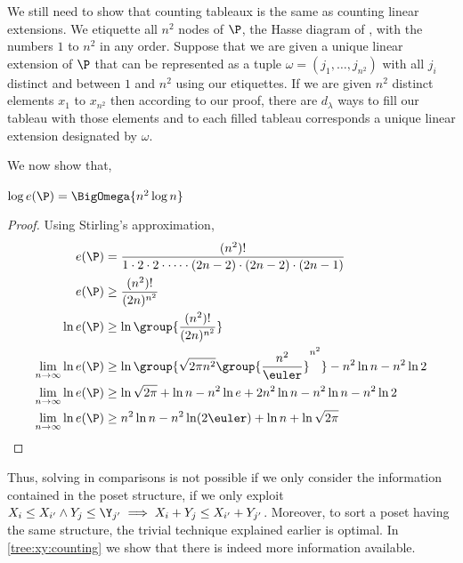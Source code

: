 We still need to show that counting tableaux is the same as counting linear
extensions. We etiquette all \( n^2 \) nodes of \(\P\), the Hasse diagram of
\XY, with the numbers \(1\) to \( n^2 \) in any order. Suppose that we are
given a unique linear extension of \(\P\) that can be represented as a tuple
\( \omega = ( j_1 , \ldots , j_{n^2}) \)
with all \( j_i \) distinct and between \(1\) and \( n^2 \) using our
etiquettes. If we are given \( n^2 \) distinct elements \( x_1 \) to
\( x_{n^2} \) then according to our proof, there are \( d_{\lambda} \) ways to
fill our tableau with those elements and to each filled tableau corresponds a
unique linear extension designated by \(\omega\).


We now show that,

\begin{theorem}
\( \log e(\P) = \BigOmega{n^2 \log n} \)
\end{theorem}

\begin{proof}
Using Stirling's approximation,
\begin{align}
e(\P) &= \frac{(n^2)!}{1 \cdot 2 \cdot 2 \cdot \cdots \cdot (2n-2) \cdot (2n-2) \cdot (2n-1)}\\
e(\P) &\ge \frac{(n^2)!}{(2n)^{n^2}}\\
\ln e(\P) &\ge \ln \group{\frac{(n^2)!}{(2n)^{n^2}}}\\
\lim_{n \to \infty} \ln e(\P) &\ge \ln{\group{\sqrt{2 \pi n^2}
\group{\frac{n^2}{\euler}}^{n^2}}}  - n^2 \ln n - n^2 \ln 2\\
\lim_{n \to \infty} \ln e(\P) &\ge \ln{\sqrt{2\pi}} + \ln n - n^2 \ln e + 2 n^2
\ln n - n^2 \ln n - n^2 \ln 2\\
\lim_{n \to \infty} \ln e(\P) &\ge n^2 \ln n - n^2 \ln (2\euler) + \ln n + \ln \sqrt{2\pi}
\end{align}
\end{proof}

Thus, solving \XY in  comparisons is not possible if we only
consider the information contained in the poset structure, \ie if we only
exploit \( X_i \le X_{i'} \land Y_j \le \Y_{j'} \implies X_i +
Y_j \le X_{i'} + Y_{j'}\). Moreover, to sort a poset having the same structure,
the trivial \mergesort technique explained earlier is optimal.
In \ref{tree:xy:counting} we show that there is indeed more information available.
